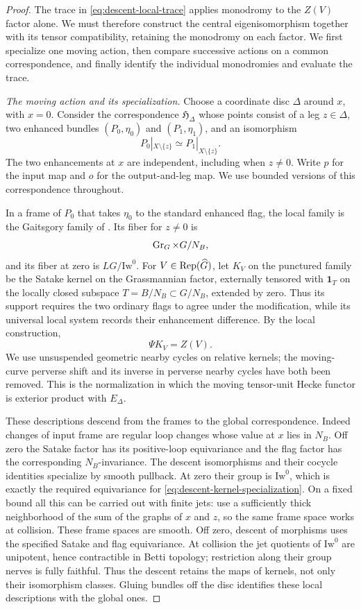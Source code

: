 \begin{proof}
The trace in \eqref{eq:descent-local-trace} applies monodromy to the
$Z(V)$ factor alone.  We must therefore construct the central
eigenisomorphism together with its tensor compatibility, retaining the
monodromy on each factor.  We first specialize one moving action, then
compare successive actions on a common correspondence, and finally
identify the individual monodromies and evaluate the trace.

\smallskip\noindent
\emph{The moving action and its specialization.}
Choose a coordinate disc $\Delta$ around $x$, with $x=0$.  Consider
the correspondence $\mathfrak H_\Delta$ whose points consist of a
leg $z\in\Delta$, two enhanced bundles $(P_0,\eta_0)$ and
$(P_1,\eta_1)$, and an isomorphism
\[
 P_0|_{X\setminus\{z\}}\simeq P_1|_{X\setminus\{z\}}.
\]
The two enhancements at $x$ are independent, including when
$z\ne0$.  Write $p$ for the input map and $o$ for the output-and-leg
map.  We use bounded versions of this correspondence throughout.

In a frame of $P_0$ that takes $\eta_0$ to the standard enhanced
flag, the local family is the Gaitsgory family of \cite[Section~6]{DT}.
Its fiber for $z\ne0$ is
\[
 \operatorname{Gr}_G\times G/N_B,
\]
and its fiber at zero is $LG/\mathrm{Iw}^0$.
For $V\in\operatorname{Rep}(\widehat G)$, let $K_V$ on the punctured family be the Satake
kernel on the Grassmannian factor, externally tensored with
$\mathbf 1_T$ on the locally closed subspace
$T=B/N_B\subset G/N_B$, extended by zero.  Thus its support requires
the two ordinary flags to agree under the modification, while its
universal local system records their enhancement difference.
By the local construction,
\begin{equation}\label{eq:descent-kernel-specialization}
 \Psi K_V=Z(V).
\end{equation}
We use unsuspended geometric nearby cycles on relative kernels; the
moving-curve perverse shift and its inverse in perverse nearby cycles
have both been removed.  This is the normalization in which the
moving tensor-unit Hecke functor is exterior product with $E_\Delta$.

These descriptions descend from the frames to the global
correspondence.  Indeed changes of input frame are regular loop
changes whose value at $x$ lies in $N_B$.  Off zero the Satake factor
has its positive-loop equivariance and the flag factor has the
corresponding $N_B$-invariance.  The descent isomorphisms and their
cocycle identities specialize by smooth pullback.  At zero their
group is $\mathrm{Iw}^0$, which is exactly the required equivariance
for \eqref{eq:descent-kernel-specialization}.
On a fixed bound all this can be carried out with finite jets: use a
sufficiently thick neighborhood of the sum of the graphs of $x$ and
$z$, so the same frame space works at collision.  These frame spaces
are smooth.  Off zero, descent of morphisms uses the specified
Satake and flag equivariance.  At collision the jet quotients of
$\mathrm{Iw}^0$ are unipotent, hence contractible in Betti topology;
restriction along their group nerves is fully faithful.  Thus the
descent retains the maps of kernels, not only their isomorphism
classes.  Gluing bundles off the disc
identifies these local descriptions with the global ones.


\end{proof}
